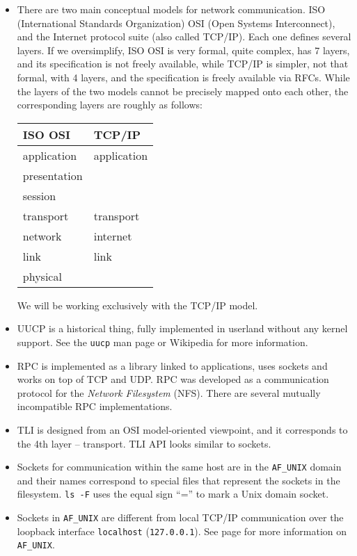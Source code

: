 \begin{itemize}
\item There are two main conceptual models for network communication.  ISO
(International Standards Organization) OSI (Open Systems Interconnect), and the
Internet protocol suite (also called TCP/IP).   Each one defines several layers.
If we oversimplify, ISO OSI is very formal, quite complex, has 7 layers, and its
specification is not freely available, while TCP/IP is simpler, not that formal,
with 4 layers, and the specification is freely available via RFCs.  While the
layers of the two models cannot be precisely mapped onto each other, the
corresponding layers are roughly as follows:

\vspace{1.5mm}

\renewcommand{\arraystretch}{1.2}
\begin{tabular}{|l|l|}\hline
ISO OSI & TCP/IP\\
\hline
\hline
application & application\\
presentation & \\
session & \\
\hline
transport & transport\\
\hline
network & internet\\
\hline
link & link\\
physical & \\
\hline
\end{tabular}
\renewcommand{\arraystretch}{1}

\vspace{1.5mm}

We will be working exclusively with the TCP/IP model.

\item UUCP is a historical thing, fully implemented in userland without any
kernel support.  See the \texttt{uucp} man page or Wikipedia for more
information.
\item RPC is implemented as a library linked to applications, uses sockets
and works on top of TCP and UDP.  RPC was developed as a communication protocol
for the \emph{Network Filesystem} (NFS).  There are several mutually
incompatible RPC implementations.
\item TLI is designed from an OSI model-oriented viewpoint, and it corresponds
to the 4th layer -- transport.  TLI API looks similar to sockets.
\item Sockets for communication within the same host are in the
\texttt{AF\_UNIX} domain and their names correspond to special files that
represent the sockets in the filesystem.  \texttt{ls -F} uses the equal sign
``='' to mark a Unix domain socket.
\item Sockets in \texttt{AF\_UNIX} are different from local TCP/IP communication
over the loopback interface \texttt{localhost} (\texttt{127.0.0.1}).  See page
\pageref{SOCKET} for more information on \texttt{AF\_UNIX}.
\end{itemize}

